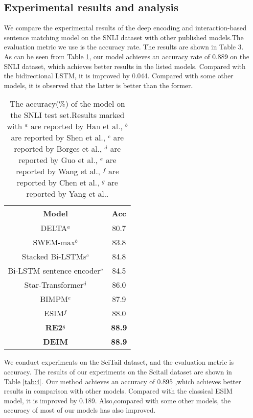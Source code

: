 \documentclass[review]{elsarticle}
\begin{document}
\subsection{Experimental results and analysis}
We compare the experimental results of the deep encoding and interaction-based sentence matching model on the SNLI dataset with other published models.The evaluation metric we use is the accuracy rate. The results are shown in Table 3. As can be seen from Table \ref{tab:3}, our model achieves an accuracy rate of 0.889 on the SNLI dataset, which achieves better results in the listed models. Compared with the bidirectional LSTM, it is improved by 0.044. Compared with some other models, 
it is observed that the latter is better than the former.
\begin{table}[htbp]
 \centering
  \caption{\label{tab:3}The accuracy($\%$) of the model on the SNLI test  set.Results marked with    $^a$ are reported by Han et al.\cite{han2019delta},  $^b$ are reported by Shen et al.\cite{shen2018baseline}, $^c$ are reported by Borges et al.\cite{borges2019combining}, $^d$ are reported by Guo et al.\cite{guo2019star}, $^e$ are reported by Wang et al.\cite{wang2017bilateral}, $^f$ are reported by Chen et al.\cite{chen2017enhanced}, $^g$ are reported by Yang et al.\cite{yang2019simple}.}
\begin{tabular}{cc}
 \toprule
Model & Acc\\
 \midrule
DELTA$^a$ & 80.7 \\
SWEM-max$^b$ & 83.8 \\
Stacked Bi-LSTMs$^c$ & 84.8 \\
Bi-LSTM sentence encoder$^c$ & 84.5 \\
Star-Transformer$^d$ & 86.0 \\
BIMPM$^e$ & 87.9 \\
ESIM$^f$ & 88.0 \\
\textbf{RE2}$^g$ & \textbf{88.9} \\
\textbf{DEIM} & \textbf{88.9} \\
\bottomrule
 \end{tabular}
\end{table}
We conduct experiments on the SciTail dataset, and the evaluation metric is accuracy.
The results of our experiments on the Scitail dataset are shown in Table \ref{tab:4}. Our method achieves an accuracy of 0.895 ,which achieves better results in comparison with other models. Compared with the classical ESIM model, it is improved by 0.189. Also,compared with some other models, 
the accuracy of most of our models has also improved.  
\end{document}
